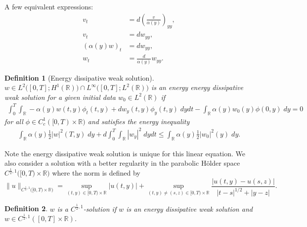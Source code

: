 \documentclass[a4paper,11pt]{article}
\newtheorem{definition}{Definition}[section]
\theoremstyle{remark}
\begin{document}
A few equivalent expressions:
\begin{equation} \label{eq:continuum}
\begin{aligned}
 v_t &= d (\frac{v}{\alpha(y)})_{yy},\\
 v_t &= d w_{yy},\\
 (\alpha(y) w)_t &= d w_{yy},\\
 w_t &= \frac{d}{\alpha(y)} w_{yy}.
\end{aligned}
\end{equation}
\begin{definition}[Energy dissipative weak solution]
 $w \in L^2\Big([0,T];H^1( \mathbb{R})\Big) \cap L^\infty\Big([0,T];L^2( \mathbb{R})\Big)$ is an energy energy dissipative weak solution for a given initial data $w_0\in L^2(\mathbb{R})$ if
 \begin{align*}
  \int_0^T \int_\mathbb{R} -\alpha(y)w(t,y)\phi_t(t,y) + d w_y(t,y)\phi_y(t,y)\; dydt - \int_\mathbb{R} \alpha(y)w_0(y)\phi(0,y) \;dy = 0
 \end{align*}
 for all $\phi \in C_c^1([0,T)\times \mathbb{R})$ and satisfies the energy inequality
\begin{align} \label{energy_inequality}
 \int_\mathbb{R} \alpha(y) \frac{1}{2} |w|^2(T,y)\; dy + d \int_0^T\int_\mathbb{R} |w_y|^2 \; dydt \le \int_\mathbb{R} \alpha(y) \frac{1}{2} |w_0|^2(y)\; dy. 
\end{align}
\end{definition}
Note the energy dissipative weak solution is unique for this linear equation. We also consider a solution with a better regularity in the parabolic H\"older space $C^{\frac{1}{2},1}\big([0,T)\times \mathbb{R}\big)$ where the norm is defined by
$$\|u\|_{C^{\frac{1}{2},1}\big([0,T)\times \mathbb{R}\big)} = \sup_{(t,y)\in [0,T)\times \mathbb{R}}|u(t,y)| + \sup_{(t,y)\ne(s,z) \in [0,T)\times \mathbb{R}} \frac{|u(t,y)-u(s,z)|}{|t-s|^{1/2} + |y-z|}.$$
\begin{definition}
$w$ is a $C^{\frac{1}{2},1}$-solution if $w$ is an energy dissipative weak solution and $w \in C^{\tfrac{1}{2},1}([0,T]\times\mathbb{R})$. 
\end{definition}
\end{document}
